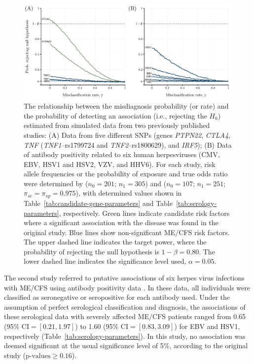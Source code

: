 \begin{figure}[h]
    \centering\includegraphics[width=\textwidth]{chapter/2023-misdiagnosis/figures/fig3-simulations-real-world.pdf}
    \caption[The relationship between the misdiagnosis probability and the probability of detecting an association estimated from simulated data from two previously published studies]{The relationship between the misdiagnosis probability (or rate) and the probability of detecting an association (i.e., rejecting the $H_0$) estimated from simulated data from two previously published studies: (A) Data from five different SNPs (genes \textit{PTPN22}, \textit{CTLA4}, \textit{TNF} (\textit{TNF1}--rs1799724 and \textit{TNF2}--rs1800629), and \textit{IRF5}); (B) Data of antibody positivity related to six human herpesviruses (CMV, EBV, HSV1 and HSV2, VZV, and HHV6). For each study, risk allele frequencies or the probability of exposure and true odds ratio were determined by \citet{steiner2020AutoimmunityRelatedRisk} ($n_0 = 201$; $n_1 = 305$) and \citet{cliff2019CellularImmune} ($n_0 =107$; $n_1 = 251$; $\pi_{se} = \pi_{sp} = 0.975$), with determined values shown in Table~\ref{tab:candidate-gene-parameters} and Table~\ref{tab:serology-parameters}, respectively. Green lines indicate candidate risk factors where a significant association with the disease was found in the original study. Blue lines show non-significant ME/CFS risk factors. The upper dashed line indicates the target power, where the probability of rejecting the null hypothesis is $1-\beta = 0.80$. The lower dashed line indicates the significance level used, $\alpha = 0.05$.}
    \label{fig:resultsrealworld}
\end{figure}

The second study referred to putative associations of six herpes virus infections with ME/CFS using antibody positivity data \citep{cliff2019CellularImmune}. In these data, all individuals were classified as seronegative or seropositive for each antibody used. Under the assumption of perfect serological classification and diagnosis, the associations of these serological data with severely affected ME/CFS patients ranged from 0.65 (95\% $\text{CI} = [0.21,1.97]$) to 1.60 (95\% $\text{CI} = [0.83,3.09]$) for EBV and HSV1, respectively (Table~\ref{tab:serology-parameters}). In this study, no association was deemed significant at the usual significance level of 5\%, according to the original study ($\text{p-values} \geq 0.16$).

